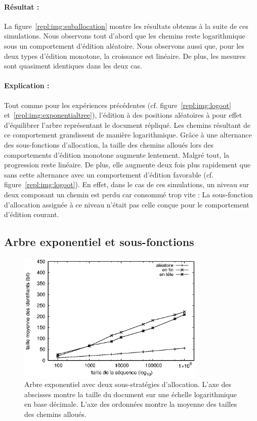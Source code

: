 \paragraph{Résultat :} La figure~\ref{repl:img:suballocation} montre les
résultats obtenus à la suite de ces simulations. Nous observons tout d'abord que
les chemins reste logarithmique sous un comportement d'édition aléatoire. Nous
observons aussi que, pour les deux types d'édition monotone, la croissance est
linéaire. De plus, les mesures sont quasiment identiques dans les deux cas.

\paragraph{Explication :} Tout comme pour les expériences précédentes
(cf. figure~\ref{repl:img:logoot} et~\ref{repl:img:exponentialtree}), l'édition
à des positions aléatoires à pour effet d'équilibrer l'arbre représentant le
document répliqué. Les chemins résultant de ce comportement grandissent de
manière logarithmique. Grâce à une alternance des sous-fonctions d'allocation,
la taille des chemins alloués lors des comportements d'édition monotone augmente
lentement. Malgré tout, la progression reste linéaire. De plus, elle augmente
deux fois plus rapidement que sans cette alternance avec un comportement
d'édition favorable (cf. figure~\ref{repl:img:logoot}). En effet, dans le cas de
ces simulations, un niveau sur deux composant un chemin est perdu car consommé
trop vite : La sous-fonction d'allocation assignée à ce niveau n'était pas celle
conçue pour le comportement d'édition courant.


\subsection{Arbre exponentiel et sous-fonctions}

\begin{figure}
  \begin{center}
    \includegraphics[width=0.8\textwidth]{img/lseq/lseq.eps}
    \caption{\label{repl:img:lseq} Arbre exponentiel avec deux sous-stratégies
      d'allocation. L'axe des abscisses montre la taille du document sur une
      échelle logarithmique en base décimale. L'axe des ordonnées montre la
      moyenne des tailles des chemins alloués.}
  \end{center}
\end{figure}

